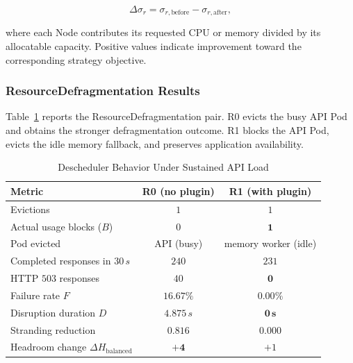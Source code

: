 \[
\Delta\sigma_r
=
\sigma_{r,\text{before}} - \sigma_{r,\text{after}},
\]

where each Node contributes its requested CPU or memory divided by its allocatable capacity. Positive values indicate improvement toward the corresponding strategy objective.

\subsubsection{ResourceDefragmentation Results}
\label{subsec:actualusage4_resultanalysis_loaded}
Table~\ref{tab:actualusage4_loaded} reports the ResourceDefragmentation pair. R0 evicts the busy API Pod and obtains the stronger defragmentation outcome. R1 blocks the API Pod, evicts the idle memory fallback, and preserves application availability.

\begin{table}[tbp]
    \centering
    \caption{Descheduler Behavior Under Sustained API Load}
    \label{tab:actualusage4_loaded}
    \renewcommand{\arraystretch}{1.2}
    \small
    \begin{tabular}{@{}l c c@{}}
        \toprule
        \textbf{Metric} & \textbf{R0 (no plugin)} & \textbf{R1 (with plugin)} \\
        \midrule
        Evictions                              & \(1\)                         & \(1\) \\
        Actual usage blocks (\(B\))            & \(0\)                         & \(\mathbf{1}\) \\
        Pod evicted                            & API (busy)                    & memory worker (idle) \\
        Completed responses in \(30\,s\)       & \(240\)                       & \(231\) \\
        HTTP \(503\) responses                 & \(40\)                        & \(\mathbf{0}\) \\
        Failure rate \(F\)                     & \(16.67\%\)                   & \(\mathbf{0.00\%}\) \\
        Disruption duration \(D\)              & \(4.875\,s\)                  & \(\mathbf{0\,s}\) \\
        Stranding reduction                    & \(\mathbf{0.816}\)            & \(0.000\) \\
        Headroom change \(\Delta H_{\text{balanced}}\) & \(\mathbf{+4}\)       & \(+1\) \\
        \bottomrule
    \end{tabular}
\end{table}

